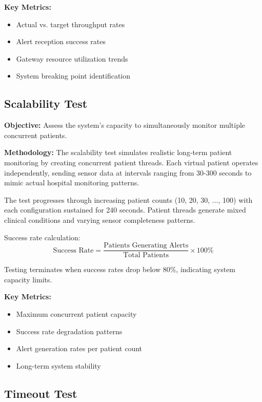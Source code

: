 \textbf{Key Metrics:}
\begin{itemize}
    \item Actual vs. target throughput rates
    \item Alert reception success rates
    \item Gateway resource utilization trends
    \item System breaking point identification
\end{itemize}

\subsection{Scalability Test}
\label{subsec:scalability-test}

\textbf{Objective:} Assess the system's capacity to simultaneously monitor multiple concurrent patients.

\textbf{Methodology:} The scalability test simulates realistic long-term patient monitoring by creating concurrent patient threads. Each virtual patient operates independently, sending sensor data at intervals ranging from 30-300 seconds to mimic actual hospital monitoring patterns.

The test progresses through increasing patient counts (10, 20, 30, ..., 100) with each configuration sustained for 240 seconds. Patient threads generate mixed clinical conditions and varying sensor completeness patterns.

Success rate calculation:
\begin{equation}
\text{Success Rate} = \frac{\text{Patients Generating Alerts}}{\text{Total Patients}} \times 100\%
\end{equation}

Testing terminates when success rates drop below 80\%, indicating system capacity limits.

\textbf{Key Metrics:}
\begin{itemize}
    \item Maximum concurrent patient capacity
    \item Success rate degradation patterns  
    \item Alert generation rates per patient count
    \item Long-term system stability
\end{itemize}

\subsection{Timeout Test}
\label{subsec:timeout-test}

